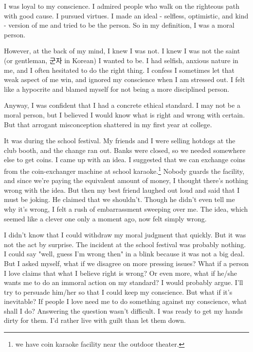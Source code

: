 \documentclass[10pt,a4paper]{article}
\begin{document}
	I was loyal to my conscience. I admired people who walk on the righteous path with good cause. I pursued virtues. I made an ideal - selfless, optimistic, and kind - version of me and tried to be the person. So in my definition, I was a moral person.
	
	However, at the back of my mind, I knew I was not. I knew I was not the saint (or gentleman, 군자 in Korean) I wanted to be. I had selfish, anxious nature in me, and I often hesitated to do the right thing. I confess I sometimes let that weak aspect of me win, and ignored my conscience when I am stressed out. I felt like a hypocrite and blamed myself for not being a more disciplined person.
	
    Anyway, I was confident that I had a concrete ethical standard. I may not be a moral person, but I believed I would know what is right and wrong with certain. But that arrogant misconception shattered in my first year at college.
	
	It was during the school festival. My friends and I were selling hotdogs at the club booth, and the change ran out. Banks were closed, so we needed somewhere else to get coins. I came up with an idea. I suggested that we can exchange coins from the coin-exchanger machine at school karaoke.\footnote{we have coin karaoke facility near the outdoor theater.} Nobody guards the facility, and since we're paying the equivalent amount of money, I thought there's nothing wrong with the idea. But then my best friend laughed out loud and said that I must be joking. He claimed that we shouldn't. Though he didn't even tell me why it's wrong, I felt a rush of embarrassment sweeping over me. The idea, which seemed like a clever one only a moment ago, now felt simply wrong.
	
	I didn't know that I could withdraw my moral judgment that quickly. But it was not the act by surprise. The incident at the school festival was probably nothing. I could say "well, guess I'm wrong then" in a blink because it was not a big deal. But I asked myself, what if we disagree on more pressing issues? What if a person I love claims that what I believe right is wrong?  Or even more, what if he/she wants me to do an immoral action on my standard? I would probably argue. I'll try to persuade him/her so that I could keep my conscience. But what if it's inevitable? If people I love need me to do something against my conscience, what shall I do? Answering the question wasn't difficult. I was ready to get my hands dirty for them. I'd rather live with guilt than let them down.
	
\end{document}
